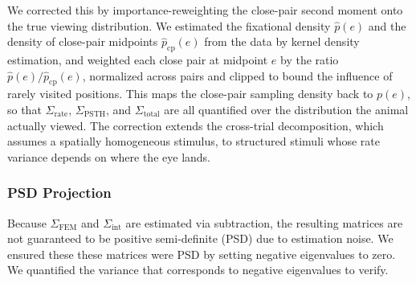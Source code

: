 \documentclass{lite}
\newcommand{\Cpsth}{\Sigma_{\text{PSTH}}}
\newcommand{\Cfem}{\Sigma_{\text{FEM}}}
\newcommand{\Ctotal}{\Sigma_{\text{total}}}
\newcommand{\Crate}{\Sigma_{\text{rate}}}
\begin{document}
We corrected this by importance-reweighting the close-pair second moment onto the true viewing distribution. We estimated the fixational density $\hat{p}(e)$ and the density of close-pair midpoints $\hat{p}_{\text{cp}}(e)$ from the data by kernel density estimation, and weighted each close pair at midpoint $e$ by the ratio $\hat{p}(e) / \hat{p}_{\text{cp}}(e)$, normalized across pairs and clipped to bound the influence of rarely visited positions. This maps the close-pair sampling density back to $p(e)$, so that $\Crate$, $\Cpsth$, and $\Ctotal$ are all quantified over the distribution the animal actually viewed. The correction extends the cross-trial decomposition, which assumes a spatially homogeneous stimulus, to structured stimuli whose rate variance depends on where the eye lands.

\subsubsection{PSD Projection}
Because $\Cfem$ and $\Sigma_{\text{int}}$ are estimated via subtraction, the resulting matrices are not guaranteed to be positive semi-definite (PSD) due to estimation noise. We ensured these these matrices were PSD by setting negative eigenvalues to zero. We quantified the variance that corresponds to negative eigenvalues to verify.




\end{document}
